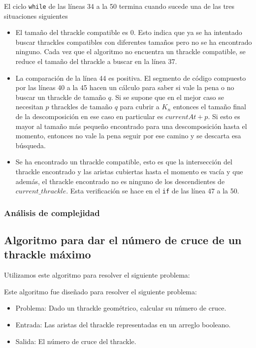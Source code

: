   El ciclo \texttt{while} de las líneas 34 a la 50 termina cuando sucede una de las tres situaciones siguientes
  \begin{itemize}
    \item El tamaño del thrackle compatible es 0. Esto indica que ya se ha intentado buscar thrackles compatibles con diferentes tamaños pero no se ha encontrado ninguno. Cada vez que el algoritmo no encuentra un thrackle compatible, se reduce el tamaño del thrackle a buscar en la línea 37.
    \item La comparación de la línea 44 es positiva. El segmento de código compuesto por las líneas 40 a la 45 hacen un cálculo para saber si vale la pena o no buscar un thrackle de tamaño $q$. Si se supone que en el mejor caso se necesitan $p$ thrackles de tamaño $q$ para cubrir a $K_n$ entonces el tamaño final de la descomposición en ese caso en particular es $currentAt + p$. Si esto es mayor al tamaño más pequeño encontrado para una descomposición hasta el momento, entonces no vale la pena seguir por ese camino y se descarta esa búsqueda.
    \item Se ha encontrado un thrackle compatible, esto es que la intersección del thrackle encontrado y las aristas cubiertas hasta el momento es vacía y que además, el thrackle encontrado no es ninguno de los descendientes de $current\_thrackle$. Esta verificación se hace en el \texttt{if} de las línea 47 a la 50.
  \end{itemize}
  \subsubsection{Análisis de complejidad}


\subsection{Algoritmo para dar el número de cruce de un thrackle máximo}
  \label{secc:algo_cnthracklemax}
  Utilizamos este algoritmo para resolver el siguiente problema:

  Este algoritmo fue diseñado para resolver el siguiente problema:
  \begin{itemize}
    \item[] Problema: Dado un thrackle geométrico, calcular su número de cruce.
    \item[] Entrada: Las aristas del thrackle representadas en un arreglo booleano.
    \item[] Salida: El número de cruce del thrackle.
  \end{itemize}

